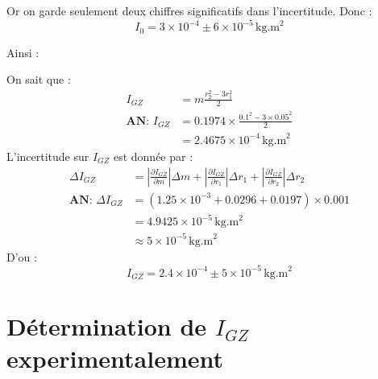 \documentclass[a4paper,12pt]{article}
\begin{document}
\begin{enumerate}
    Or on garde seulement deux chiffres significatifs dans l'incertitude. Donc :
    $$ I_0 = 3 \times 10^{-4} \pm 6 \times 10^{-5} \, \text{kg.m}^2 $$
\end{enumerate}

Ainsi :

On sait que : 
\begin{align*}
    I_{GZ} & = m \frac{r^2_2 - 3r^2_1}{2} \\
    \textbf{AN: } I_{GZ} & = 0.1974 \times \frac{0.1^2 - 3 \times 0.05^2}{2} \\
    & = 2.4675 \times 10^{-4} \, \text{kg.m}^2
\end{align*}
L'incertitude sur $I_{GZ}$ est donnée par :
\begin{align*}
    \Delta I_{GZ} & = \left|\frac{\partial I_{GZ}}{\partial m}\right|\Delta m + \left|\frac{\partial I_{GZ}}{\partial r_1}\right|\Delta r_1 + \left|\frac{\partial I_{GZ}}{\partial r_2}\right|\Delta r_2\\
    \textbf{AN: } \Delta I_{GZ} & = \left(1.25 \times 10^{-3} + 0.0296 + 0.0197 \right) \times 0.001\\
    & = 4.9425 \times 10^{-5} \, \text{kg.m}^2 \\
    & \approx 5 \times 10^{-5} \, \text{kg.m}^2
\end{align*}
D'ou : $$I_{GZ} = 2.4 \times 10^{-4} \pm 5 \times 10^{-5} \, \text{kg.m}^2$$

\section{Détermination de $I_{GZ}$ experimentalement}


\end{document}
